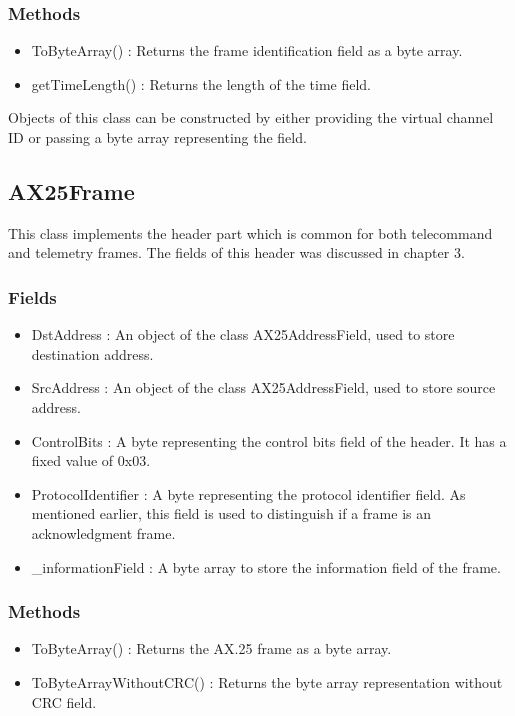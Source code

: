 \documentclass[BTech]{iitmdiss}
\begin{document}
\subsubsection{Methods}
\begin{itemize}
\item ToByteArray() : Returns the frame identification field as a byte array.
\item getTimeLength() : Returns the length of the time field.
\end{itemize}


Objects of this class can be constructed by either providing the virtual channel ID or passing a byte array representing the field.
\subsection{AX25Frame}
This class implements the header part which is common for both telecommand and telemetry frames. The fields of this header was discussed in chapter 3.

\subsubsection{Fields}
\begin{itemize}
\item DstAddress : An object of the class AX25AddressField, used to store destination address.
\item SrcAddress : An object of the class AX25AddressField, used to store source address.
\item ControlBits : A byte representing the control bits field of the header. It has a fixed value of 0x03.
\item ProtocolIdentifier : A byte representing the protocol identifier field. As mentioned earlier, this field is used to distinguish if a frame is an acknowledgment frame.
\item \_informationField : A byte array to store the information field of the frame.
\end{itemize}

\subsubsection{Methods}
\begin{itemize}
\item ToByteArray() : Returns the AX.25 frame as a byte array.
\item ToByteArrayWithoutCRC() :  Returns the byte array representation without CRC field.
\end{itemize}
\end{document}
